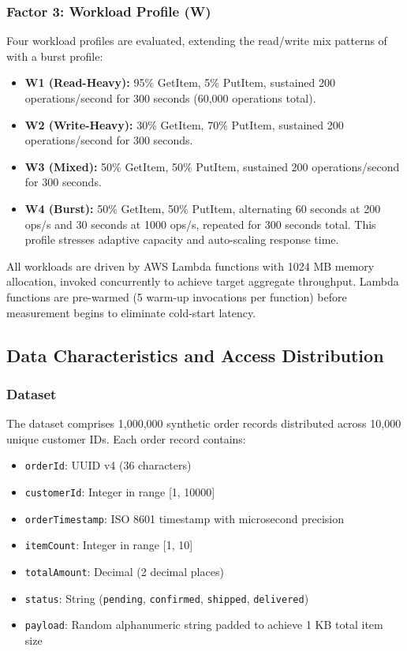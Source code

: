 \subsubsection{Factor 3: Workload Profile (W)}

Four workload profiles are evaluated, extending the read/write mix patterns of \citet{pantelic2026benchmarking} with a burst profile:

\begin{itemize}
    \item \textbf{W1 (Read-Heavy):} 95\% GetItem, 5\% PutItem, sustained 200 operations/second for 300 seconds (60,000 operations total).
    \item \textbf{W2 (Write-Heavy):} 30\% GetItem, 70\% PutItem, sustained 200 operations/second for 300 seconds.
    \item \textbf{W3 (Mixed):} 50\% GetItem, 50\% PutItem, sustained 200 operations/second for 300 seconds.
    \item \textbf{W4 (Burst):} 50\% GetItem, 50\% PutItem, alternating 60 seconds at 200 ops/s and 30 seconds at 1000 ops/s, repeated for 300 seconds total. This profile stresses adaptive capacity and auto-scaling response time.
\end{itemize}

All workloads are driven by AWS Lambda functions with 1024 MB memory allocation, invoked concurrently to achieve target aggregate throughput. Lambda functions are pre-warmed (5 warm-up invocations per function) before measurement begins to eliminate cold-start latency.

\subsection{Data Characteristics and Access Distribution}

\subsubsection{Dataset}

The dataset comprises 1,000,000 synthetic order records distributed across 10,000 unique customer IDs. Each order record contains:

\begin{itemize}
    \item \texttt{orderId}: UUID v4 (36 characters)
    \item \texttt{customerId}: Integer in range [1, 10000]
    \item \texttt{orderTimestamp}: ISO 8601 timestamp with microsecond precision
    \item \texttt{itemCount}: Integer in range [1, 10]
    \item \texttt{totalAmount}: Decimal (2 decimal places)
    \item \texttt{status}: String (\texttt{pending}, \texttt{confirmed}, \texttt{shipped}, \texttt{delivered})
    \item \texttt{payload}: Random alphanumeric string padded to achieve 1 KB total item size
\end{itemize}

